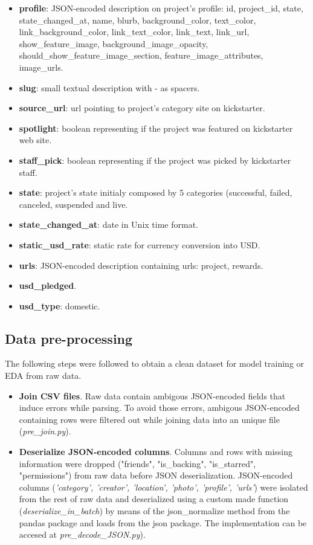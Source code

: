 \documentclass{article}
\begin{document}
{\begin{itemize}
    \item \textbf{profile}: JSON-encoded description on project's profile: id, project\_id, state, state\_changed\_at, name, blurb, background\_color, text\_color, link\_background\_color, link\_text\_color, link\_text, link\_url, show\_feature\_image, background\_image\_opacity, should\_show\_feature\_image\_section, feature\_image\_attributes, image\_urls. 
    \item \textbf{slug}: small textual description with - as spacers.
    \item \textbf{source\_url}: url pointing to project's category site on kickstarter.
    \item \textbf{spotlight}: boolean representing if the project was featured on kickstarter web site.
    \item \textbf{staff\_pick}: boolean representing if the project was picked by kickstarter staff.
    \item \textbf{state}: project's state initialy composed by 5 categories (successful, failed, canceled, suspended and live.
    \item \textbf{state\_changed\_at}: date in Unix time format.
    \item \textbf{static\_usd\_rate}: static rate for currency conversion into USD.
    \item \textbf{urls}: JSON-encoded description containing urls: project, rewards.
    \item \textbf{usd\_pledged}.
    \item \textbf{usd\_type}: domestic.
    
\end{itemize} 

\subsection{Data pre-processing}
\label{subsec:data_prepro}
The following steps were followed to obtain a clean dataset for model training or EDA from raw data.
\begin{itemize}
    \item \textbf{Join CSV files}.
Raw data contain ambigous JSON-encoded fields that induce errors while parsing. To avoid those errors, ambigous JSON-encoded containing rows were filtered out while joining data into an unique file (\emph{pre\_join.py}).

    \item \textbf{Deserialize JSON-encoded columns}.
Columns and rows with missing information were dropped ("friends", "is\_backing", "is\_starred", "permissions") from raw data before JSON deserialization.
JSON-encoded columns (\emph{'category', 'creator', 'location', 'photo', 'profile', 'urls'}) were isolated from the rest of raw data and deserialized using a custom made function (\emph{deserialize\_in\_batch}) by means of the json\_normalize method from the pandas package and loads from the json package. The implementation can be accesed at \emph{pre\_decode\_JSON.py}).


\end{itemize}}
\end{document}
